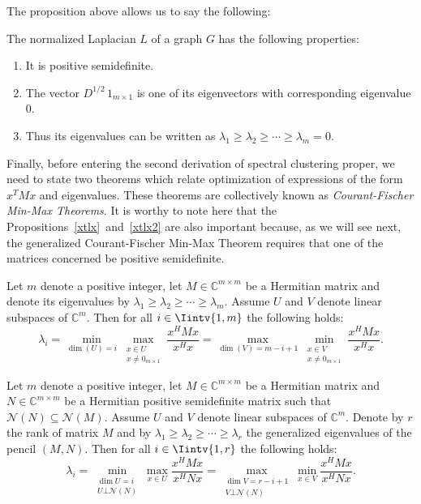 The proposition above allows us to say the following:

\begin{corollary}
   The normalized Laplacian $L$ of a graph $G$ has the following properties:
   \begin{enumerate}
      \item It is positive semidefinite.
      \item The vector $D^{1/2} \, 1_{m \times 1}$ is one of its eigenvectors with corresponding eigenvalue $0$.
      \item Thus its eigenvalues can be written as $\lambda_1 \ge \lambda_2 \ge \cdots \ge \lambda_m = 0$.
   \end{enumerate}
\end{corollary}

Finally, before entering the second derivation of spectral clustering proper, we need to state two theorems which relate optimization of expressions of the form $x^TMx$ and eigenvalues.
These theorems are collectively known as \textit{Courant-Fischer Min-Max Theorems}.
   It is worthy to note here that the Propositions~\ref{xtlx}~and~\vref{xtlx2} are also important because, as we will see next, the generalized Courant-Fischer Min-Max Theorem requires that one of the matrices concerned be positive semidefinite. 

\begin{theorem} \label{minmax1}
   Let $m$ denote a positive integer, let $M \in \mathbb{C}^{m \times m}$ be a Hermitian matrix and denote its eigenvalues by $\lambda_1 \ge \lambda_2 \ge \cdots \ge \lambda_m$. 
   Assume $U$ and $V$ denote linear subspaces of $\mathbb C^{m }$.
   Then for all $i \in \Iintv{1,m}$ the following holds:
\begin{equation}
   \lambda_i = \min_{\dim (U) = i} \max_{\substack{x \in U \\ x \ne 0_{m \times 1}}} \frac{x^HMx}{x^Hx} = \max_{\dim (V) = m-i+1} \min_{\substack{x \in V \\ x \ne 0_{m \times 1}}} \frac{x^HMx}{x^Hx}.
\end{equation}
\end{theorem}

\begin{theorem} \label{minmax2}
   Let $m$ denote a positive integer, let $M \in \mathbb {C} ^{m \times m}$ be a Hermitian matrix and $N \in \mathbb C ^{m \times m}$ be a Hermitian positive semidefinite matrix such that $\mathcal N (N)  \subseteq \mathcal N (M)$.
   Assume $U$ and $V$ denote linear subspaces of $\mathbb C^{m }$.
   Denote by $r$ the rank of matrix $M$ and by $\lambda_1 \ge \lambda_2 \ge \cdots \ge \lambda_r$ the generalized eigenvalues of the pencil $(M,N)$.
   Then for all $i \in \Iintv{1,r}$ the following holds:
   \begin{equation}
      \lambda_i = \min_{\substack{ \dim U = i \\ U \bot \mathcal N (N)}} \max_{x \in U} \frac{x^HMx}{x^HNx} = \max_{\substack{\dim  V = r - i + 1 \\ V \bot \mathcal N (N)}} \min_{x \in V} \frac{x^HMx}{x^HNx}.
   \end{equation}
\end{theorem}

